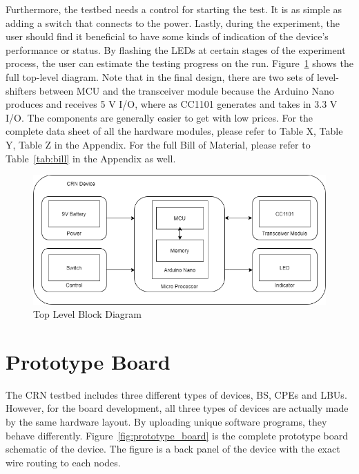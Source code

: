 Furthermore, the testbed needs a control for starting the test. It is as simple as adding a switch that connects to the power. Lastly, during the experiment, the user should find it beneficial to have some kinds of indication of the device's performance or status. By flashing the LEDs at certain stages of the experiment process, the user can estimate the testing progress on the run. Figure~\ref{fig:block_diagram} shows the full top-level diagram. Note that in the final design, there are two sets of level-shifters between MCU and the transceiver module because the Arduino Nano produces and receives 5 V I/O, where as CC1101 generates and takes in 3.3 V I/O. The components are generally easier to get with low prices. For the complete data sheet of all the hardware modules, please refer to Table X, Table Y, Table Z in the Appendix. For the full Bill of Material, please refer to Table~\ref{tab:bill} in the Appendix as well.

\begin{figure}[ht]
\centering
\includegraphics[width=12cm]{figures/new_block_diagram.png}
\caption{Top Level Block Diagram}
\label{fig:block_diagram}
\end{figure}


\section{Prototype Board}

The CRN testbed includes three different types of devices, BS, CPEs and LBUs. However, for the board development, all three types of devices are actually made by the same hardware layout. By uploading unique software programs, they behave differently. Figure~\ref{fig:prototype_board} is the complete prototype board schematic of the device. The figure is a back panel of the device with the exact wire routing to each nodes.

